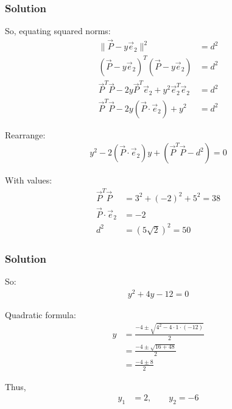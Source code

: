 \documentclass{beamer}
\theoremstyle{remark}
\numberwithin{equation}{section}
\numberwithin{equation}{section}
\begin{document}
\begin{frame}
\frametitle{Solution}
So, equating squared norms:
\begin{align}
\|\vec{P} - y\vec{e}_2\|^2 &= d^2 \\
(\vec{P} - y\vec{e}_2)^T (\vec{P} - y\vec{e}_2) &= d^2 \\
\vec{P}^T \vec{P} - 2y \vec{P}^T \vec{e}_2 + y^2 \vec{e}_2^T \vec{e}_2 &= d^2 \\
\vec{P}^T \vec{P} - 2y (\vec{P} \cdot \vec{e}_2) + y^2 &= d^2
\end{align}

Rearrange:
\begin{align}
y^2 - 2(\vec{P} \cdot \vec{e}_2) y + (\vec{P}^T \vec{P} - d^2) = 0
\end{align}

With values:
\begin{align}
\vec{P}^T \vec{P} &= 3^2 + (-2)^2 + 5^2 = 38 \\
\vec{P} \cdot \vec{e}_2 &= -2 \\
d^2 &= (5\sqrt{2})^2 = 50
\end{align}
\end{frame}
\begin{frame}
\frametitle{Solution}
So:
\begin{align}
y^2 + 4y - 12 = 0
\end{align}

Quadratic formula:
\begin{align}
y &= \frac{-4 \pm \sqrt{4^2 - 4 \cdot 1 \cdot (-12)}}{2} \\
  &= \frac{-4 \pm \sqrt{16 + 48}}{2} \\
  &= \frac{-4 \pm 8}{2}
\end{align}

Thus,
\begin{align}
y_1 &= 2, \qquad y_2 = -6
\end{align}
\end{frame}
\end{document}
